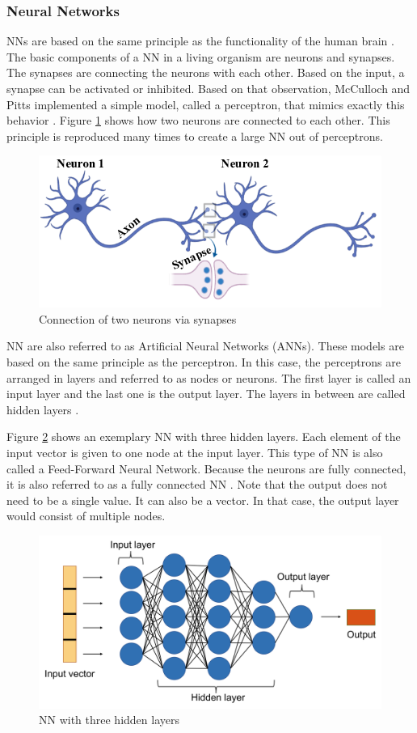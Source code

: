 \subsubsection*{Neural Networks}\label{NN chapter}
NNs are based on the same principle as the functionality of the human brain \cite{Janiesch}.
The basic components of a NN in a living organism are neurons and synapses. The synapses are connecting the neurons with each other. Based on the input, a synapse can be activated or inhibited. Based on that observation, McCulloch and Pitts implemented a simple model, called a perceptron, that mimics exactly this behavior \cite{Theodoridis}.
Figure \ref{fig:2nn} shows how two neurons are connected to each other. This principle is reproduced many times to create a large NN out of perceptrons.
\begin{figure}[H]
	\centering
	\includegraphics[width=0.8\linewidth]{IMGs/2NN.png}
	\caption{Connection of two neurons via synapses \cite{Das}}
	\label{fig:2nn}
\end{figure}
\newpage
NN are also referred to as Artificial Neural Networks (ANNs). These models are based on the same principle as the perceptron. In this case, the perceptrons are arranged in layers and referred to as nodes or neurons. The first layer is called an input layer and the last one is the output layer. The layers in between are called hidden layers \cite{JOOST}. 

Figure \ref{fig:NN1} shows an exemplary NN with three hidden layers. Each element of the input vector is given to one node at the input layer. This type of NN is also called a Feed-Forward Neural Network. Because the neurons are fully connected, it is also referred to as a fully connected NN \cite{Sainath}. Note that the output does not need to be a single value. It can also be a vector. In that case, the output layer would consist of multiple nodes.

\begin{figure}[H]
	\centering
	\includegraphics[width=0.8\linewidth]{IMGs/NN1.png}
	\caption{NN with three hidden layers}
	\label{fig:NN1}
\end{figure}
 
